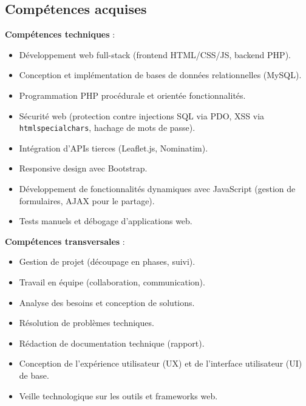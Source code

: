 \documentclass[a4paper,12pt]{article}
\begin{document}
\subsection{Compétences acquises}
\textbf{Compétences techniques} :
\begin{itemize}
  \item Développement web full-stack (frontend HTML/CSS/JS, backend PHP).
  \item Conception et implémentation de bases de données relationnelles (MySQL).
  \item Programmation PHP procédurale et orientée fonctionnalités.
  \item Sécurité web (protection contre injections SQL via PDO, XSS via \texttt{htmlspecialchars}, hachage de mots de passe).
  \item Intégration d’APIs tierces (Leaflet.js, Nominatim).
  \item Responsive design avec Bootstrap.
  \item Développement de fonctionnalités dynamiques avec JavaScript (gestion de formulaires, AJAX pour le partage).
  \item Tests manuels et débogage d'applications web.
\end{itemize}

\textbf{Compétences transversales} :
\begin{itemize}
  \item Gestion de projet (découpage en phases, suivi).
  \item Travail en équipe (collaboration, communication).
  \item Analyse des besoins et conception de solutions.
  \item Résolution de problèmes techniques.
  \item Rédaction de documentation technique (rapport).
  \item Conception de l'expérience utilisateur (UX) et de l'interface utilisateur (UI) de base.
  \item Veille technologique sur les outils et frameworks web.
\end{itemize}
\end{document}
